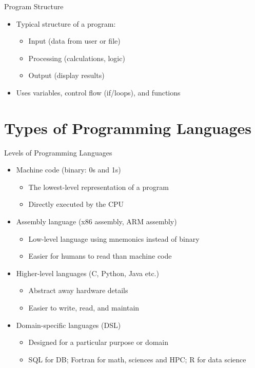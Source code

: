 \documentclass[12pt, aspectratio=169]{beamer}
\begin{document}
    \begin{frame}{Program Structure}
        \begin{itemize}
            \item Typical structure of a program:
            \begin{itemize}
                \item Input (data from user or file)
                \item Processing (calculations, logic)
                \item Output (display results)
            \end{itemize}
            \item Uses variables, control flow (if/loops), and functions
        \end{itemize}
    \end{frame}


    \section{Types of Programming Languages}


    \begin{frame}{Levels of Programming Languages}
        \begin{itemize}
            \item Machine code (binary: 0s and 1s)
            \begin{itemize}
                \item The lowest-level representation of a program
                \item Directly executed by the CPU
            \end{itemize}
            
            \item Assembly language (x86 assembly, ARM assembly)
            \begin{itemize}
                \item Low-level language using mnemonics instead of binary
                \item Easier for humans to read than machine code
            \end{itemize}

            \item Higher-level languages (C, Python, Java etc.)
            \begin{itemize} 
                \item Abstract away hardware details
                \item Easier to write, read, and maintain
            \end{itemize}

            \item Domain-specific languages (DSL)
            \begin{itemize}
                \item Designed for a particular purpose or domain
                \item SQL for DB; Fortran for math, sciences and HPC; R for data science
            \end{itemize}
        \end{itemize}
    \end{frame}
\end{document}
